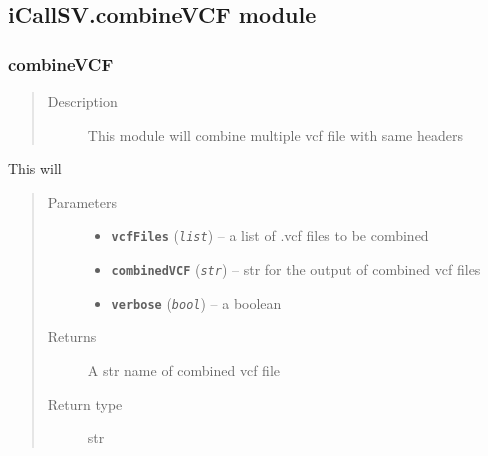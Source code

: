 \documentclass[letterpaper,10pt,english]{sphinxmanual}
\begin{document}
\subsection{iCallSV.combineVCF module}
\label{iCallSV:module-iCallSV.combineVCF}\label{iCallSV:icallsv-combinevcf-module}

\subsubsection{combineVCF}
\label{iCallSV:combinevcf}\begin{quote}\begin{description}
\item[{Description}] \leavevmode
This module will combine multiple vcf file with same headers

\end{description}\end{quote}

\begin{fulllineitems}
\label{iCallSV:iCallSV.combineVCF.run}
This will 
\begin{quote}\begin{description}
\item[{Parameters}] \leavevmode\begin{itemize}
\item {} 
\textbf{\texttt{vcfFiles}} (\emph{\texttt{list}}) -- a list of .vcf files to be combined

\item {} 
\textbf{\texttt{combinedVCF}} (\emph{\texttt{str}}) -- str for the output of combined vcf files

\item {} 
\textbf{\texttt{verbose}} (\emph{\texttt{bool}}) -- a boolean

\end{itemize}

\item[{Returns}] \leavevmode
A str name of combined vcf file

\item[{Return type}] \leavevmode
str

\end{description}\end{quote}

\end{fulllineitems}
\end{document}
